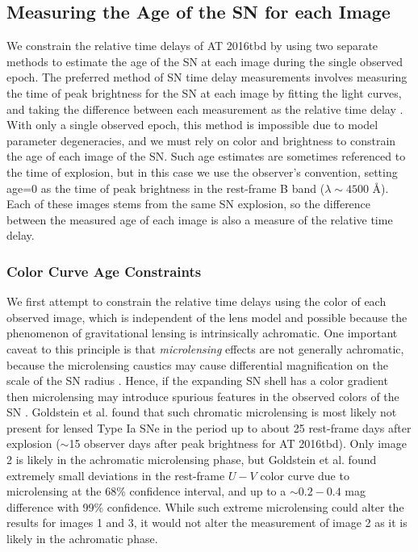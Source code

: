 \documentclass[12pt]{article}
\def\SNABC{AT 2016tbd\xspace}
\begin{document}
{\subsection*{Measuring the Age of the SN for each Image}
We constrain the relative time delays of \SNABC by using two separate methods to estimate the age of the SN at each image during the single observed epoch. The preferred method of SN time delay measurements involves measuring the time of peak brightness for the SN at each image by fitting the light curves, and taking the difference between each measurement as the relative time delay \cite{pierel_turning_2019,dhawan_magnification_2019,huber_strongly_2019}. With only a single observed epoch, this method is impossible due to model parameter degeneracies, and we must rely on color and brightness to constrain the age of each image of the SN. Such age estimates are sometimes referenced to the time of explosion, but in this case we use the observer's convention, setting age=0 as the time of peak brightness in the rest-frame B band ($\lambda\sim4500$ \AA).  Each of these images stems from the same SN explosion, so the difference between the measured age of each image is also a measure of the relative time delay. 

\subsubsection*{Color Curve Age Constraints}

We first attempt to constrain the relative time delays using the color of each observed image, which is independent of the lens model and possible because the phenomenon of gravitational lensing is intrinsically achromatic. One important caveat to this principle is that {\it microlensing} effects are not generally achromatic, because the microlensing caustics may cause differential magnification on the scale of the SN radius \cite{goldstein_precise_2018,foxley-marrable_impact_2018,bonvin_impact_2019}.  Hence, if the expanding SN shell has a color gradient then microlensing may introduce spurious features in the observed colors of the SN \cite{kochanek_quantitative_2004,vernardos_joint_2018}.   Goldstein et al. \cite{goldstein_precise_2018} found that such chromatic microlensing is most likely not present for lensed Type Ia SNe in the period up to about 25 rest-frame days after explosion ($\sim$15 observer days after peak brightness for \SNABC). Only image 2 is likely in the achromatic microlensing phase, but Goldstein et al. \cite{goldstein_precise_2018} found extremely small deviations in the rest-frame $U-V$ color curve due to microlensing at the 68\% confidence interval, and up to a $\sim0.2-0.4$ mag difference with 99\% confidence. While such extreme microlensing could alter the results for images 1 and 3, it would not alter the measurement of image 2 as it is likely in the achromatic phase.

}
\end{document}
